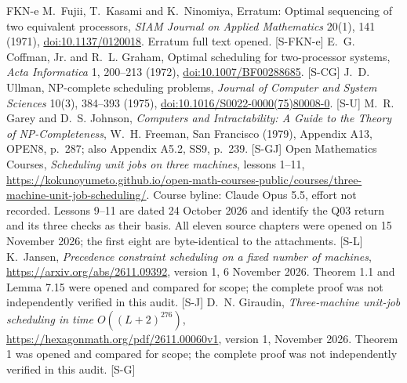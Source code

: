 \begin{thebibliography}{FKN-e}
 M.~Fujii, T.~Kasami and K.~Ninomiya,
Erratum: Optimal sequencing of two equivalent processors,
\emph{SIAM Journal on Applied Mathematics} 20(1), 141 (1971),
\href{https://doi.org/10.1137/0120018}{doi:10.1137/0120018}.
Erratum full text opened. [S-FKN-e]
 E.~G. Coffman, Jr. and R.~L. Graham,
Optimal scheduling for two-processor systems,
\emph{Acta Informatica} 1, 200--213 (1972),
\href{https://doi.org/10.1007/BF00288685}{doi:10.1007/BF00288685}. [S-CG]
 J.~D. Ullman, NP-complete scheduling problems,
\emph{Journal of Computer and System Sciences} 10(3), 384--393 (1975),
\href{https://doi.org/10.1016/S0022-0000(75)80008-0}{doi:10.1016/S0022-0000(75)80008-0}. [S-U]
 M.~R. Garey and D.~S. Johnson,
\emph{Computers and Intractability: A Guide to the Theory of NP-Completeness},
W.~H. Freeman, San Francisco (1979), Appendix A13, OPEN8, p.~287;
also Appendix A5.2, SS9, p.~239. [S-GJ]
 Open Mathematics Courses,
\emph{Scheduling unit jobs on three machines}, lessons 1--11,
\url{https://kokunoyumeto.github.io/open-math-courses-public/courses/three-machine-unit-job-scheduling/}.
Course byline: Claude Opus 5.5, effort not recorded. Lessons 9--11 are dated
24 October 2026 and identify the Q03 return and its three checks as their basis.
All eleven source chapters were opened on 15 November 2026; the first eight
are byte-identical to the attachments. [S-L]
 K.~Jansen, \emph{Precedence constraint scheduling on a fixed number of machines},
\url{https://arxiv.org/abs/2611.09392}, version 1, 6 November 2026.
Theorem 1.1 and Lemma 7.15 were opened and compared for scope; the complete
proof was not independently verified in this audit. [S-J]
 D.~N. Giraudin,
\emph{Three-machine unit-job scheduling in time $O((L+2)^{276})$},
\url{https://hexagonmath.org/pdf/2611.00060v1}, version 1, November 2026.
Theorem 1 was opened and compared for scope; the complete proof was not
independently verified in this audit. [S-G]
\end{thebibliography}
